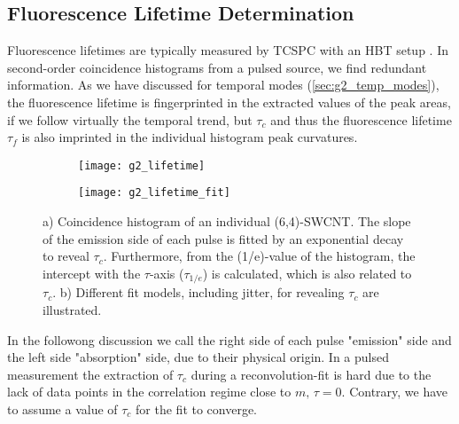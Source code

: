 \subsection{Fluorescence Lifetime Determination}\label{sec:lifetime}
Fluorescence lifetimes are typically measured by \ac{TCSPC} with an \ac{HBT} setup \cite{miyauchiFemtosecondExcitationCorrelation2009}. In second-order coincidence histograms from a pulsed source, we find redundant information. As we have discussed for temporal modes (\cref{sec:g2_temp_modes}), the fluorescence lifetime is fingerprinted in the extracted values of the peak areas, if we follow virtually the temporal trend, but $\tau_c$ and thus the fluorescence lifetime $\tau_f$ is also imprinted in the individual histogram peak curvatures.
\begin{figure}[htp]
	\centering
	\begin{subfigure}{0.49\linewidth}
		\centering
		\texttt{[image: g2\_lifetime]}
		\caption{}
		\label{fig:g2_lifetime}
	\end{subfigure}
	\hfill
	\begin{subfigure}{0.485\linewidth}
		\centering
		\texttt{[image: g2\_lifetime\_fit]}
		\caption{}
		\label{fig:g2_lifetime_fit}
	\end{subfigure}
	\caption{a) Coincidence histogram of an individual (6,4)-\ac{SWCNT}. The slope of the emission side of each pulse is fitted by an exponential decay to reveal $\tau_c$. Furthermore, from the (1/e)-value of the histogram, the intercept with the $\tau$-axis ($\tau_{1/e}$) is calculated, which is also related to $\tau_c$. b) Different fit models, including jitter, for revealing $\tau_c$ are illustrated.}
\end{figure}
\noindent In the followong discussion we call the right side of each pulse "emission" side and the left side "absorption" side, due to their physical origin. In a pulsed measurement the extraction of $\tau_c$ during a reconvolution-fit is hard due to the lack of data points in the correlation regime close to $m,\,\tau=0$. Contrary, we have to assume a value of $\tau_c $ for the fit to converge.\\
